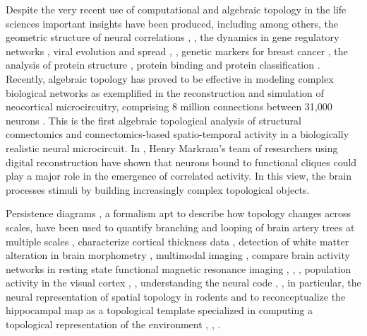 \documentclass[onecollarge,runningheads]{svjour2}
\begin{document}
Despite the very recent use of computational and algebraic topology in the life sciences important insights have been produced, including among others, the geometric structure of neural correlations \cite{giusti2015clique}, \cite{dotko2016topological}, the dynamics in gene regulatory networks \cite{boczko2005structure}, viral evolution and spread \cite{chan2013topology}, \cite{taylor2015topological}, genetic markers for breast cancer \cite{nicolau2011topology}, the analysis of protein structure \cite{xia2014persistent}, protein binding \cite{kovacev2016using} and protein classification \cite{cang2015topological}. Recently, algebraic topology has proved to be effective in modeling complex biological networks as exemplified in the reconstruction and simulation of neocortical microcircuitry, comprising 8 million connections between 31,000 neurons \cite{markram2015reconstruction}. This is the first algebraic topological analysis of structural connectomics and connectomics-based spatio-temporal activity in a biologically realistic neural microcircuit.  In \cite{reimann2017cliques}, Henry Markram's team of researchers using digital reconstruction have shown that neurons bound to functional cliques could play a major role in the emergence of correlated activity. In this view, the brain processes stimuli by building increasingly complex topological objects.

Persistence diagrams \cite{edelsbrunner2000topological}, a formalism apt to describe how topology changes across scales, have been used to quantify branching and looping of brain artery trees at multiple scales \cite{bendich2016persistent}, characterize cortical thickness data \cite{chung2009persistence}, detection of white matter alteration in brain morphometry \cite{chung2015persistent}, multimodal imaging \cite{lee2017integrated}, compare brain activity networks in resting state functional magnetic resonance imaging \cite{petri2014homological}, \cite{cassidy2015brain}, \cite{lord2016insights}, population activity in the visual cortex \cite{singh2008topological}, \cite{pirino2015topological}, understanding the neural code \cite{curto2017makes}, \cite{curto2017can}, in particular, the neural representation of spatial topology in rodents \cite{chen2014neural} and to reconceptualize the hippocampal map as a topological template specialized in computing a topological representation of the environment \cite{dabaghian2012topological}, \cite{dabaghian2014reconceiving}, \cite{babichev2016topological}.
\end{document}
